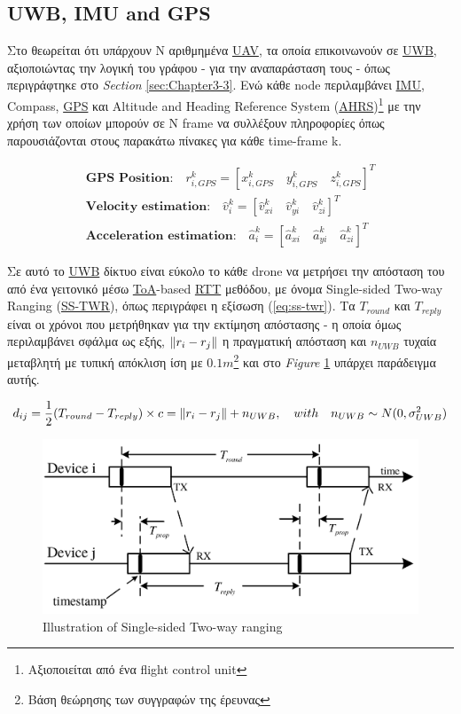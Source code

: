 

\subsection{UWB, IMU and GPS}
Στο \cite{uwb-imu-gps1} θεωρείται ότι υπάρχουν Ν αριθμημένα \hyperref[abbr:UAV]{UAV}, τα οποία επικοινωνούν σε \hyperref[abbr:UWB]{UWB}, 
αξιοποιώντας την λογική του γράφου - για την αναπαράσταση τους - όπως 
περιγράφτηκε στο \emph{Section} \ref{sec:Chapter3-3}. Ενώ κάθε node περιλαμβάνει \hyperref[abbr:IMU]{IMU}, Compass, \hyperref[abbr:GPS]{GPS} και A\-lti\-tu\-de and Heading Re\-fe\-re\-nce 
System (\hyperref[abbr:AHRS]{AHRS})\footnote{Αξιοποιείται από ένα flight control unit} με την χρήση των οποίων μπορούν σε N frame να συλλέξουν 
πληροφορίες όπως παρουσιάζονται στους πα\-ρα\-κά\-τω πίνακες για κάθε time-frame k.

\begin{gather*}
	\textbf{GPS Position:}\quad r^k_{i, GPS} = \left[x^k_{i, GPS} \quad y^k_{i, GPS} \quad z^k_{i, GPS}\right]^T \\
	\textbf{Velocity estimation:}\quad\hat{v}^k_i = \left[\hat{v}^k_{xi} \quad \hat{v}^k_{yi} \quad \hat{v}^k_{zi}\right]^T \\
	\textbf{Acceleration estimation:}\quad\hat{a}^k_i = \left[\hat{a}^k_{xi} \quad \hat{a}^k_{yi} \quad \hat{a}^k_{zi}\right]^T
\end{gather*}

Σε αυτό το \hyperref[abbr:UWB]{UWB} δίκτυο είναι εύκολο το κάθε drone να μετρήσει την απόσταση του από ένα γειτονικό
μέσω \hyperref[abbr:ToA]{ToA}-based \hyperref[abbr:RTT]{RTT} μεθόδου, με όνομα Single-sided Two-way Ranging (\hyperref[abbr:SS-TWR]{SS-TWR}),
όπως περιγράφει η εξίσωση (\ref{eq:ss-twr}). Τα $T_{round}$ και $T_{reply}$ είναι
οι χρόνοι που μετρήθηκαν για την εκτίμηση απόστασης - η οποία όμως περιλαμβάνει σφάλμα ως εξής, $\left\lVert r_i - r_j\right\rVert$ η πραγματική απόσταση και $n_{UWB}$ τυχαία μεταβλητή με τυπική απόκλιση ίση με 
$0.1m$\footnote{Βάση θεώρησης των συγγραφών της έρευνας} και στο \emph{Figure} \ref{fig:SS-TWR} υπάρχει παράδειγμα αυτής.

\begin{gather}
    d_{ij} = \frac{1}{2}(T_{round} - T_{reply}) \times c = \left\lVert r_i - r_j\right\rVert + n_{UWB}, \quad with \quad n_{UWB} \sim N(0, \sigma^2_{UWB}) \label{eq:ss-twr}
\end{gather}

\begin{figure} [H]
	\centering
	\includegraphics[width=0.69
	\linewidth]{Images/Related-Work/Single-Sided-Two-Way-Ranging-SS-TWR-5.png}
	\decoRule
	\caption[Illustration of Single-sided Two-way ranging]{Illustration of Single-sided Two-way ranging \cite{uwb-imu-gps1}}
	\label{fig:SS-TWR}
\end{figure}

